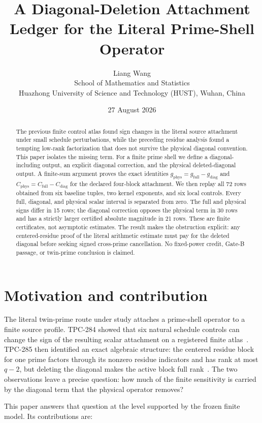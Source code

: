 \documentclass[11pt]{article}
\title{A Diagonal-Deletion Attachment Ledger for the Literal Prime-Shell Operator}
\author{Liang Wang\\
School of Mathematics and Statistics\\
Huazhong University of Science and Technology (HUST), Wuhan, China}
\date{27 August 2026}
\newcommand{\1}{\mathbf{1}}
\newcommand{\phys}{\mathrm{phys}}
\newcommand{\full}{\mathrm{full}}
\newcommand{\del}{\mathrm{diag}}
\begin{document}
\maketitle

\begin{abstract}
The previous finite control atlas found sign changes in the literal source
attachment under small schedule perturbations, while the preceding residue
analysis found a tempting low-rank factorization that does not survive the
physical diagonal convention.  This paper isolates the missing term.  For a
finite prime shell we define a diagonal-including output, an explicit
diagonal correction, and the physical deleted-diagonal output.  A finite-sum
argument proves the exact identities
$g_{\phys}=g_{\full}-g_{\del}$ and
$C_{\phys}=C_{\full}-C_{\del}$ for the declared four-block attachment.
We then replay all 72 rows obtained from six baseline tuples, two kernel
exponents, and six local controls.  Every full, diagonal, and physical scalar
interval is separated from zero.  The full and physical signs differ in 15
rows; the diagonal correction opposes the physical term in 30 rows and has a
strictly larger certified absolute magnitude in 21 rows.  These are finite
certificates, not asymptotic estimates.  The result makes the obstruction
explicit: any centered-residue proof of the literal arithmetic estimate must
pay for the deleted diagonal before seeking signed cross-prime cancellation.
No fixed-power credit, Gate-B passage, or twin-prime conclusion is claimed.
\end{abstract}

\section{Motivation and contribution}

The literal twin-prime route under study attaches a prime-shell operator to a
finite source profile.  TPC-284 showed that six natural schedule controls can
change the sign of the resulting scalar attachment on a registered finite
atlas~\cite{tpc284}.  TPC-285 then identified an exact algebraic structure: the
centered residue block for one prime factors through its nonzero residue
indicators and has rank at most $q-2$, but deleting the diagonal makes the
active block full rank~\cite{tpc285}.  The two observations leave a precise
question: how much of the finite sensitivity is carried by the diagonal term
that the physical operator removes?

This paper answers that question at the level supported by the frozen finite
model.  Its contributions are:
\end{document}
